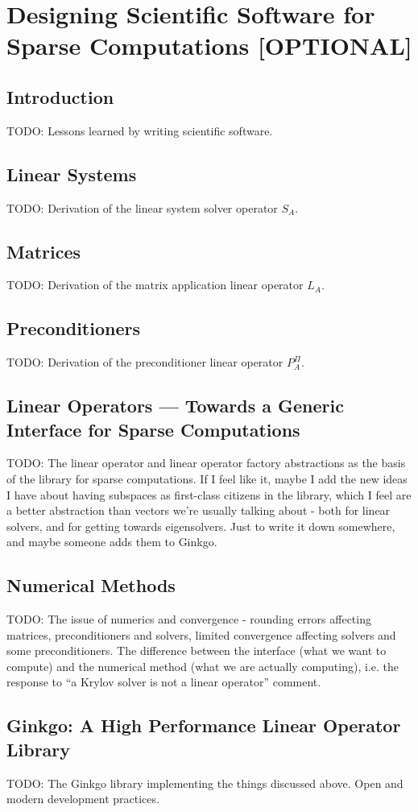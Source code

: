 \section{Designing Scientific Software for Sparse Computations [OPTIONAL]}
\subsection{Introduction}
TODO: Lessons learned by writing scientific software.
\subsection{Linear Systems}
TODO: Derivation of the linear system solver operator $S_A$.
\subsection{Matrices}
TODO: Derivation of the matrix application linear operator $L_A$.
\subsection{Preconditioners}
TODO: Derivation of the preconditioner linear operator $P^\Pi_A$.
\subsection{Linear Operators --- Towards a Generic Interface for Sparse
            Computations}
TODO: The linear operator and linear operator factory abstractions as the basis
      of the library for sparse computations.
      If I feel like it, maybe I add the new ideas I have about having subspaces
      as first-class citizens in the library, which I feel are a better
      abstraction than vectors we're usually talking about - both for linear
      solvers, and for getting towards eigensolvers. Just to write it down
      somewhere, and maybe someone adds them to Ginkgo.
\subsection{Numerical Methods}
TODO: The issue of numerics and convergence - rounding errors affecting
matrices, preconditioners and solvers, limited convergence affecting solvers and
some preconditioners. The difference between the interface (what we want to
compute) and the numerical method (what we are actually computing), i.e. the
response to ``a Krylov solver is not a linear operator'' comment.

\subsection{Ginkgo: A High Performance Linear Operator Library}
TODO: The Ginkgo library implementing the things discussed above. Open and
modern development practices.



